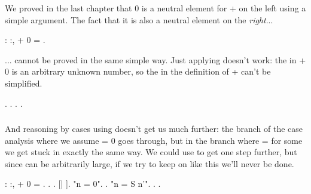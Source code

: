 \documentclass[12pt]{report}
\begin{document}
 We proved in the last chapter that 0 is a neutral element
    for + on the left using a simple argument.  The fact that it is
    also a neutral element on the \textit{right}... \begin{coqdoccode}
\coqdocemptyline
\coqdocnoindent
{}  : \coqdockw{\ensuremath{\forall}} :,\coqdoceol
\coqdocindent{1.00em}
 + 0 = .\coqdoceol
\coqdocemptyline
\end{coqdoccode}
... cannot be proved in the same simple way.  Just applying
   doesn't work: the  in  + 0 is an arbitrary
  unknown number, so the  in the definition of + can't be
  simplified.  \begin{coqdoccode}
\coqdocemptyline
\coqdocnoindent
{}.\coqdoceol
\coqdocindent{1.00em}
 .\coqdoceol
\coqdocindent{1.00em}
. \coqdocnoindent
{}.\coqdoceol
\coqdocemptyline
\end{coqdoccode}
\subsubsection{ }



 And reasoning by cases using   doesn't get us much
   further: the branch of the case analysis where we assume  = 0
   goes through, but in the branch where  =   for some  we
   get stuck in exactly the same way.  We could use   to
   get one step further, but since  can be arbitrarily large, if we
   try to keep on like this we'll never be done. \begin{coqdoccode}
\coqdocemptyline
\coqdocnoindent
{}  : \coqdockw{\ensuremath{\forall}} :,\coqdoceol
\coqdocindent{1.00em}
 + 0 = .\coqdoceol
\coqdocnoindent
{}.\coqdoceol
\coqdocindent{1.00em}
 .    [| ].\coqdoceol
\coqdocindent{1.00em}
 "n = 0".\coqdoceol
\coqdocindent{2.00em}
. \coqdocindent{1.00em}
 "n = S n'".\coqdoceol
\coqdocindent{2.00em}
. \coqdocnoindent
{}.\coqdoceol
\coqdocemptyline
\end{coqdoccode}
\end{document}
